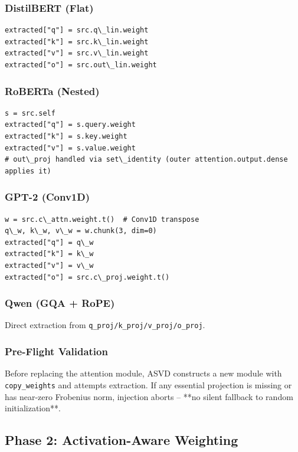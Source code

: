 \subsubsection{DistilBERT (Flat)}

\begin{lstlisting}
extracted["q"] = src.q\_lin.weight
extracted["k"] = src.k\_lin.weight
extracted["v"] = src.v\_lin.weight
extracted["o"] = src.out\_lin.weight
\end{lstlisting}

\subsubsection{RoBERTa (Nested)}

\begin{lstlisting}
s = src.self
extracted["q"] = s.query.weight
extracted["k"] = s.key.weight
extracted["v"] = s.value.weight
# out\_proj handled via set\_identity (outer attention.output.dense applies it)
\end{lstlisting}

\subsubsection{GPT-2 (Conv1D)}

\begin{lstlisting}
w = src.c\_attn.weight.t()  # Conv1D transpose
q\_w, k\_w, v\_w = w.chunk(3, dim=0)
extracted["q"] = q\_w
extracted["k"] = k\_w
extracted["v"] = v\_w
extracted["o"] = src.c\_proj.weight.t()
\end{lstlisting}

\subsubsection{Qwen (GQA + RoPE)}

Direct extraction from \texttt{q\_proj/k\_proj/v\_proj/o\_proj}.

\subsubsection{Pre-Flight Validation}

Before replacing the attention module, ASVD constructs a new module with 
\texttt{copy\_weights} and attempts extraction. If any essential projection is 
missing or has near-zero Frobenius norm, injection aborts -- **no silent 
fallback to random initialization**.

\subsection{Phase 2: Activation-Aware Weighting}

